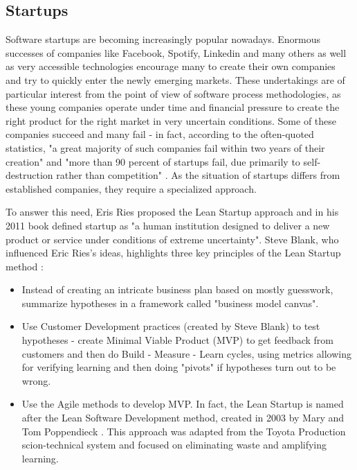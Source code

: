\documentclass{article}
\begin{document}
\subsection{Startups}
Software startups are becoming increasingly popular nowadays. Enormous successes of companies like Facebook, Spotify, Linkedin and many others as well as very accessible technologies encourage many to create their own companies and try to quickly enter the newly emerging markets. These undertakings are of particular interest from the point of view of software process methodologies, as these young companies operate under time and financial pressure to create the right product for the right market in very uncertain conditions. Some of these companies succeed and many fail - in fact, according to the often-quoted statistics, "a great majority of such companies fail within two years of their creation" \citep{paternoster2014software} and "more than 90 percent of startups fail, due primarily to self-destruction rather than competition" \citep{giardino2014early}. As the situation of startups differs from established companies, they require a specialized approach. 

To answer this need, Eris Ries proposed the Lean Startup approach and in his 2011 book defined startup as "a human institution designed to deliver a new product or service under conditions of extreme uncertainty"\citep{ries2011lean}. Steve Blank, who influenced Eric Ries's ideas, highlights three key principles of the Lean Startup method \citep{blank2013lean}:
\begin{itemize}
  \item Instead of creating an intricate business plan based on mostly guesswork, summarize hypotheses in a framework called "business model canvas".
  \item Use Customer Development practices (created by Steve Blank) to test hypotheses - create Minimal Viable Product (MVP) to get feedback from customers and then do Build - Measure - Learn cycles, using metrics allowing for verifying learning and then doing "pivots" if hypotheses turn out to be wrong.
  \item Use the Agile methods to develop MVP. In fact, the Lean Startup is named after the Lean Software Development method, created in 2003 by Mary and Tom Poppendieck \citep{poppendieck2003lean}. This approach was adapted from the Toyota Production scion-technical system and focused on eliminating waste and amplifying learning.
\end{itemize}
\end{document}
